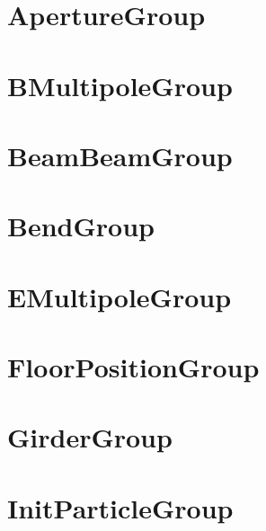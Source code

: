 \section{ApertureGroup}
\label{s:aperture.g}


\section{BMultipoleGroup}
\label{s:bmultipole.g}

\section{BeamBeamGroup}
\label{s:beam.beam.g}

\section{BendGroup}
\label{s:bend.g}

\section{EMultipoleGroup}
\label{s:emulitipole.g}

\section{FloorPositionGroup}
\label{s:floor.position.g}

\section{GirderGroup}
\label{s:girder.g}

\section{InitParticleGroup}
\label{s:init.particle.g}

